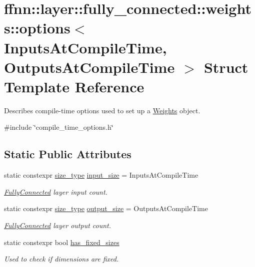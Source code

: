 \hypertarget{structffnn_1_1layer_1_1fully__connected_1_1weights_1_1options}{\section{ffnn\-:\-:layer\-:\-:fully\-\_\-connected\-:\-:weights\-:\-:options$<$ Inputs\-At\-Compile\-Time, Outputs\-At\-Compile\-Time $>$ Struct Template Reference}
\label{structffnn_1_1layer_1_1fully__connected_1_1weights_1_1options}
}


Describes compile-\/time options used to set up a \hyperlink{classffnn_1_1layer_1_1fully__connected_1_1_weights}{Weights} object.  




{\ttfamily \#include \char`\"{}compile\-\_\-time\-\_\-options.\-h\char`\"{}}

\subsection*{Static Public Attributes}
\begin{DoxyCompactItemize}
\item 
static constexpr \hyperlink{namespaceffnn_a63b90a2fd70eb76684eac482a51633e5}{size\-\_\-type} \hyperlink{structffnn_1_1layer_1_1fully__connected_1_1weights_1_1options_aa9973b3dcef51f2684f3c36bbeccd767}{input\-\_\-size} = Inputs\-At\-Compile\-Time
\begin{DoxyCompactList}\small\item\em \hyperlink{classffnn_1_1layer_1_1_fully_connected}{Fully\-Connected} layer input count. \end{DoxyCompactList}\item 
static constexpr \hyperlink{namespaceffnn_a63b90a2fd70eb76684eac482a51633e5}{size\-\_\-type} \hyperlink{structffnn_1_1layer_1_1fully__connected_1_1weights_1_1options_a45dac283a1611df3497baf255d8645c1}{output\-\_\-size} = Outputs\-At\-Compile\-Time
\begin{DoxyCompactList}\small\item\em \hyperlink{classffnn_1_1layer_1_1_fully_connected}{Fully\-Connected} layer output count. \end{DoxyCompactList}\item 
static constexpr bool \hyperlink{structffnn_1_1layer_1_1fully__connected_1_1weights_1_1options_acb66c282ebaa5f29ce34d14b68551b94}{has\-\_\-fixed\-\_\-sizes}
\begin{DoxyCompactList}\small\item\em Used to check if dimensions are fixed. \end{DoxyCompactList}\end{DoxyCompactItemize}


